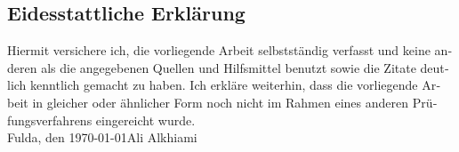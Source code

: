 \newpage
\begin{otherlanguage}{ngerman}
\thispagestyle{empty}
\section*{Eidesstattliche Erklärung}
\thispagestyle{empty}
Hiermit versichere ich, die vorliegende Arbeit selbstständig verfasst und keine anderen als die angegebenen Quellen und Hilfsmittel benutzt sowie die Zitate deutlich kenntlich gemacht zu haben.
\newline
Ich erkläre weiterhin, dass die vorliegende Arbeit in gleicher oder ähnlicher Form noch nicht im Rahmen eines
anderen Prüfungsverfahrens eingereicht wurde.
\vspace{4\baselineskip}\\
Fulda, den \today \hfill Ali Alkhiami
\vspace{4\baselineskip}\\
\end{otherlanguage}